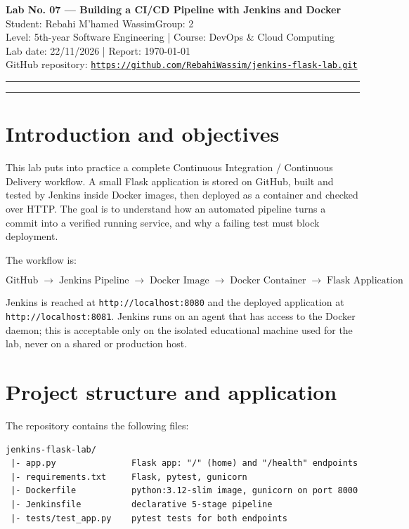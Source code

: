 \documentclass[11pt,a4paper]{article}
\newcommand{\studentName}{Rebahi M'hamed Wassim}
\newcommand{\studentGroup}{2}
\newcommand{\repoURL}{https://github.com/RebahiWassim/jenkins-flask-lab.git}
\begin{document}
\begin{center}
{\Large\bfseries Lab No. 07 --- Building a CI/CD Pipeline with Jenkins and Docker}\\[3mm]
Student: \studentName \hfill Group: \studentGroup\\
Level: 5th-year Software Engineering \quad | \quad Course: DevOps \& Cloud Computing\\
Lab date: 22/11/2026 \quad | \quad Report: \today\\[2mm]
GitHub repository: \href{\repoURL}{\texttt{\repoURL}}
\end{center}

\hrule\vspace{3mm}

\tableofcontents\vspace{2mm}

\hrule\vspace{4mm}

\section{Introduction and objectives}

This lab puts into practice a complete Continuous Integration / Continuous Delivery
workflow. A small Flask application is stored on GitHub, built and tested by Jenkins
inside Docker images, then deployed as a container and checked over HTTP. The goal is
to understand how an automated pipeline turns a commit into a verified running service,
and why a failing test must block deployment.

The workflow is:

\[
  \text{GitHub} \;\longrightarrow\; \text{Jenkins Pipeline} \;\longrightarrow\;
  \text{Docker Image} \;\longrightarrow\; \text{Docker Container} \;\longrightarrow\;
  \text{Flask Application}
\]

Jenkins is reached at \texttt{http://localhost:8080} and the deployed application at
\texttt{http://localhost:8081}. Jenkins runs on an agent that has access to the Docker
daemon; this is acceptable only on the isolated educational machine used for the lab,
never on a shared or production host.

\section{Project structure and application}

The repository contains the following files:

\begin{lstlisting}[basicstyle=\ttfamily\footnotesize]
jenkins-flask-lab/
 |- app.py               Flask app: "/" (home) and "/health" endpoints
 |- requirements.txt     Flask, pytest, gunicorn
 |- Dockerfile           python:3.12-slim image, gunicorn on port 8000
 |- Jenkinsfile          declarative 5-stage pipeline
 |- tests/test_app.py    pytest tests for both endpoints
\end{lstlisting}
\end{document}

